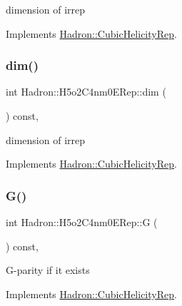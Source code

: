 dimension of irrep 

Implements \mbox{\hyperlink{structHadron_1_1CubicHelicityRep_a95d229a05580e65f8bdde74a1e316855}{Hadron\+::\+Cubic\+Helicity\+Rep}}.

\mbox{\label{structHadron_1_1H5o2C4nm0ERep_a0f02fe46b046e8aa23d25931a87505d6}} 
\subsubsection{\texorpdfstring{dim()}{dim()}\hspace{0.1cm}{\footnotesize\ttfamily [3/3]}}
{\footnotesize\ttfamily int Hadron\+::\+H5o2\+C4nm0\+E\+Rep\+::dim (\begin{DoxyParamCaption}{ }\end{DoxyParamCaption}) const\hspace{0.3cm}{\ttfamily [inline]}, {\ttfamily [virtual]}}

dimension of irrep 

Implements \mbox{\hyperlink{structHadron_1_1CubicHelicityRep_a95d229a05580e65f8bdde74a1e316855}{Hadron\+::\+Cubic\+Helicity\+Rep}}.

\mbox{\label{structHadron_1_1H5o2C4nm0ERep_a9dfac60bb29f12f13f0672f303630db6}} 
\subsubsection{\texorpdfstring{G()}{G()}\hspace{0.1cm}{\footnotesize\ttfamily [1/3]}}
{\footnotesize\ttfamily int Hadron\+::\+H5o2\+C4nm0\+E\+Rep\+::G (\begin{DoxyParamCaption}{ }\end{DoxyParamCaption}) const\hspace{0.3cm}{\ttfamily [inline]}, {\ttfamily [virtual]}}

G-\/parity if it exists 

Implements \mbox{\hyperlink{structHadron_1_1CubicHelicityRep_a50689f42be1e6170aa8cf6ad0597018b}{Hadron\+::\+Cubic\+Helicity\+Rep}}.

\mbox{\label{structHadron_1_1H5o2C4nm0ERep_a9dfac60bb29f12f13f0672f303630db6}} 
